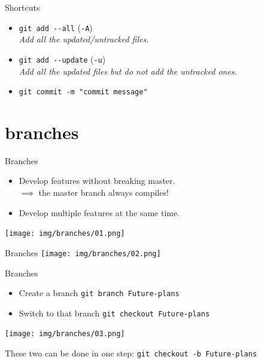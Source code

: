 \documentclass[usenames,dvipsnames,9pt]{beamer}
\begin{document}
\begin{frame}{Shortcuts}
\begin{itemize}
  \item \lstinline|git add --all| \hspace{1cm}(\lstinline|-A|)\\
  \emph{Add all the updated/untracked files.}
  \item \lstinline|git add --update| \hspace{1cm}(\lstinline|-u|)\\
  \emph{Add all the updated files but do not add the untracked ones.}
  \item \lstinline|git commit -m "commit message"|
\end{itemize}
\end{frame}



\section{branches}

%
%
\begin{frame}{Branches}
\begin{itemize}
  \item Develop features without breaking master.\\
  $\implies$ the master branch always compiles! {\color{OliveGreen}\checkmark}
  \item Develop multiple features at the same time.

\end{itemize}
\vspace{0.5cm}
\texttt{[image: img/branches/01.png]}
\end{frame}

\begin{frame}{Branches}
  \vspace{-0.45cm}
\texttt{[image: img/branches/02.png]}
\end{frame}

\begin{frame}{Branches}
  \begin{itemize}
    \item Create a branch \lstinline|git branch Future-plans|
    \item Switch to that branch \lstinline|git checkout Future-plans|
  \end{itemize}
\vspace{-1cm}
\texttt{[image: img/branches/03.png]}
\vspace{-1cm}

These two can be done in one step: \lstinline|git checkout -b Future-plans|
\end{frame}
\end{document}
